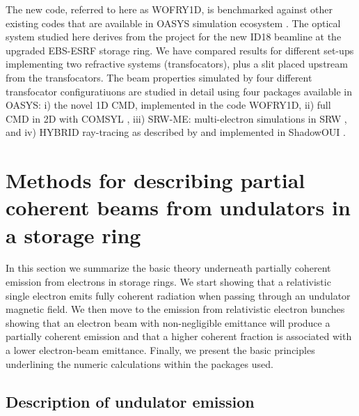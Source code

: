 \documentclass{iucr}              %
\begin{document}
The new code, referred to here as WOFRY1D, is benchmarked against other existing codes that are available in OASYS simulation ecosystem \cite{codeOASYS}. The optical system studied here derives from the project for the new ID18 beamline at the upgraded EBS-ESRF storage ring. We have compared results for different set-ups implementing two refractive systems (transfocators), plus a slit placed upstream from the transfocators. The beam properties simulated by four different transfocator configuratiuons are studied in detail using four packages available in OASYS: i) the novel 1D CMD, implemented in the code WOFRY1D, ii) full CMD in 2D with COMSYL \cite{codeCOMSYL}, iii) SRW-ME: multi-electron simulations in SRW \cite{codeSRW}, and iv) HYBRID ray-tracing as described by  and implemented in ShadowOUI \cite{codeSHADOWOUI}.


\section{Methods for describing partial coherent beams from undulators in a storage ring}\label{sec:part_coh}

In this section we summarize the basic theory underneath partially coherent emission from electrons in storage rings. We start showing that a relativistic single electron emits fully coherent radiation when passing through an undulator magnetic field. We then move to the emission from relativistic electron bunches showing that an electron beam with non-negligible emittance will produce a partially coherent emission and that a higher coherent fraction is associated with a lower electron-beam emittance. Finally, we present the basic principles underlining the numeric calculations within the packages used.


\subsection{Description of undulator emission}
\label{sec:undulator}
\end{document}
